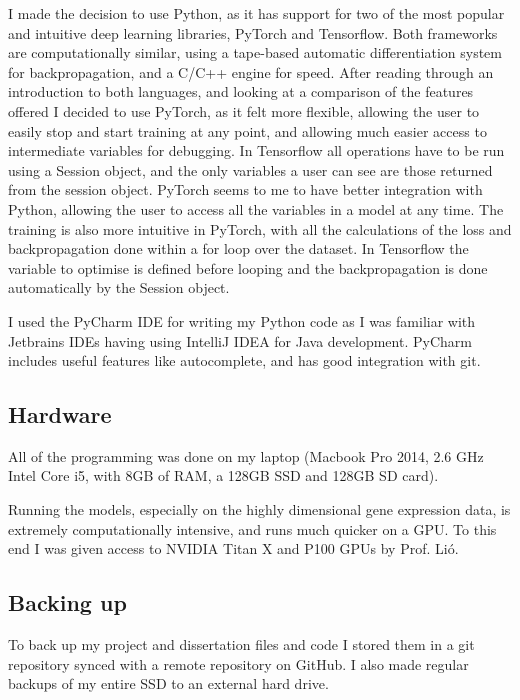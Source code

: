 \documentclass[12pt,a4paper,twoside,openright]{report}
\begin{document}
I made the decision to use Python, as it has support for two of the most popular and intuitive deep learning libraries, PyTorch and 
Tensorflow. Both frameworks are computationally similar, using a tape-based automatic differentiation system for backpropagation, and a C/C++ 
engine for speed. After reading through an introduction to both languages, and looking at a comparison of the features offered I decided to 
use PyTorch, as it felt more flexible, allowing the user to easily stop and start training at any point, and allowing much easier access 
to intermediate variables for debugging. In Tensorflow all operations have to be run using a Session object, and the only variables a 
user can see are those returned from the session object. PyTorch seems to me to have better integration with Python, allowing the user to 
access all the variables in a model at any time. The training is also more intuitive in PyTorch, with all the calculations of the loss 
and backpropagation done within a for loop over the dataset. In Tensorflow the variable to optimise is defined before looping and the 
backpropagation is done automatically by the Session object.

I used the PyCharm IDE for writing my Python code as I was familiar with Jetbrains IDEs having using IntelliJ IDEA for Java development.
PyCharm includes useful features like autocomplete, and has good integration with git.

\subsection{Hardware}

All of the programming was done on my laptop (Macbook Pro 2014, 2.6 GHz Intel Core i5, with 8GB of RAM, a 128GB SSD and 128GB SD card).

Running the models, especially on the highly dimensional gene expression data, is extremely computationally intensive, and runs much 
quicker on a GPU. To this end I was given access to NVIDIA Titan X and P100 GPUs by Prof. Li\'o.

\subsection{Backing up}

To back up my project and dissertation files and code I stored them in a git repository synced with a remote repository on GitHub. I also 
made regular backups of my entire SSD to an external hard drive.
\end{document}
